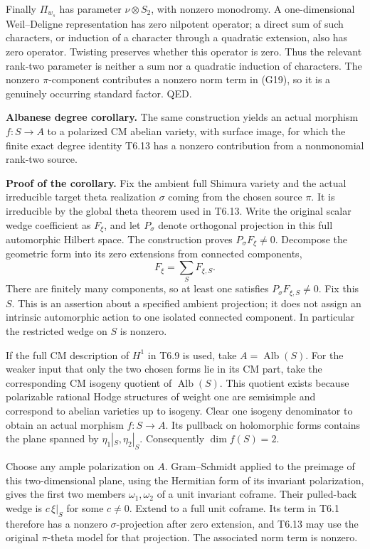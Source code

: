 \documentclass[11pt,a4paper]{article}
\theoremstyle{definition}
\begin{document}
Finally \(\Pi_{w_s}\) has parameter \(\nu\otimes S_2\), with nonzero monodromy. A one-dimensional Weil--Deligne representation has zero nilpotent operator; a direct sum of such characters, or induction of a character through a quadratic extension, also has zero operator. Twisting preserves whether this operator is zero. Thus the relevant rank-two parameter is neither a sum nor a quadratic induction of characters. The nonzero \(\pi\)-component contributes a nonzero norm term in (G19), so it is a genuinely occurring standard factor. QED.

\textbf{Albanese degree corollary.} The same construction yields an actual morphism \(f:S\to A\) to a polarized CM abelian variety, with surface image, for which the finite exact degree identity T6.13 has a nonzero contribution from a nonmonomial rank-two source.

\textbf{Proof of the corollary.} Fix the ambient full Shimura variety and the actual irreducible target theta realization \(\sigma\) coming from the chosen source \(\pi\). It is irreducible by the global theta theorem used in T6.13. Write the original scalar wedge coefficient as \(F_\xi\), and let \(P_\sigma\) denote orthogonal projection in this full automorphic Hilbert space. The construction proves \(P_\sigma F_\xi\ne0\). Decompose the geometric form into its zero extensions from connected components, \[
F_\xi=\sum_S F_{\xi,S}.
\] There are finitely many components, so at least one satisfies \(P_\sigma F_{\xi,S}\ne0\). Fix this \(S\). This is an assertion about a specified ambient projection; it does not assign an intrinsic automorphic action to one isolated connected component. In particular the restricted wedge on \(S\) is nonzero.

If the full CM description of \(H^1\) in T6.9 is used, take \(A=\operatorname{Alb}(S)\). For the weaker input that only the two chosen forms lie in its CM part, take the corresponding CM isogeny quotient of \(\operatorname{Alb}(S)\). This quotient exists because polarizable rational Hodge structures of weight one are semisimple and correspond to abelian varieties up to isogeny. Clear one isogeny denominator to obtain an actual morphism \(f:S\to A\). Its pullback on holomorphic forms contains the plane spanned by \(\eta_1|_S,\eta_2|_S\). Consequently \(\dim f(S)=2\).

Choose any ample polarization on \(A\). Gram--Schmidt applied to the preimage of this two-dimensional plane, using the Hermitian form of its invariant polarization, gives the first two members \(\omega_1,\omega_2\) of a unit invariant coframe. Their pulled-back wedge is \(c\,\xi|_S\) for some \(c\ne0\). Extend to a full unit coframe. Its term in T6.1 therefore has a nonzero \(\sigma\)-projection after zero extension, and T6.13 may use the original \(\pi\)-theta model for that projection. The associated norm term is nonzero.
\end{document}
